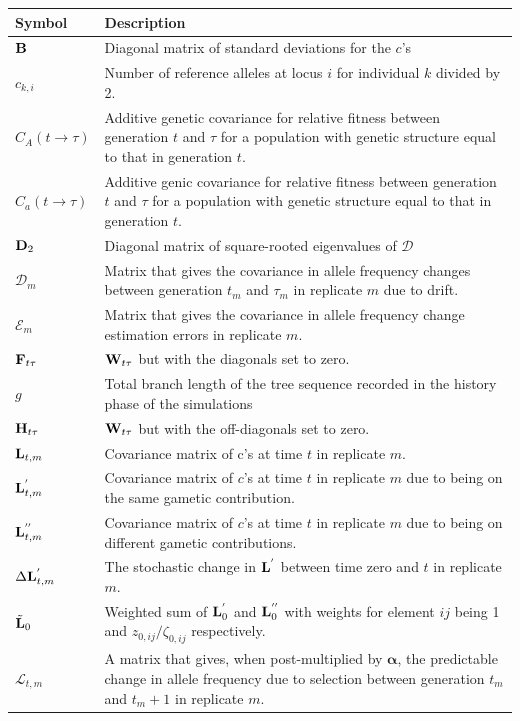 \documentclass[12pt]{article}
\begin{document}
\begin{longtable}{|p{2cm}|p{13cm}|}
\hline
Symbol&Description\\
\hline
${\bf B}$&Diagonal matrix of standard deviations for the $c$'s\\
$c_{k,i}$& Number of reference alleles at locus $i$ for individual $k$ divided by 2.\\
$C_{A}(t\rightarrow\tau)$&Additive genetic covariance for relative fitness between generation $t$ and $\tau$ for a population with genetic structure equal to that in generation $t$.\\
$C_{a}(t\rightarrow\tau)$&Additive genic covariance for relative fitness between generation $t$ and $\tau$ for a population with genetic structure equal to that in generation $t$.\\
${\bf D}_{2}$&Diagonal matrix of square-rooted eigenvalues of $\boldsymbol{\mathcal{D}}$\\
$\boldsymbol{\mathcal{D}}_m$&Matrix that gives the covariance in allele frequency changes between generation $t_m$ and $\tau_m$ in replicate $m$ due to drift.\\
$\boldsymbol{\mathcal{E}}_m$&Matrix that gives the covariance in allele frequency change estimation errors in replicate $m$.\\
${\bf F}_{t\tau}$&${\bf W}_{t\tau}$ but with the diagonals set to zero.\\
$g$&Total branch length of the tree sequence recorded in the history phase of the simulations\\
${\bf H}_{t\tau}$&${\bf W}_{t\tau}$ but with the off-diagonals set to zero.\\
${\bf L}_{t,m}$&Covariance matrix of c's at time $t$ in replicate $m$.\\
${\bf L}^{'}_{t,m}$&Covariance matrix of $c$'s at time $t$ in replicate $m$ due to being on the same gametic contribution. \\
${\bf L}^{''}_{t,m}$&Covariance matrix of $c$'s at time $t$ in replicate $m$ due to being on different gametic contributions. \\
$\Delta{\bf L}^{'}_{t,m}$&The stochastic change in ${\bf L}^{'}$ between time zero and $t$ in replicate $m$.\\
$\tilde{\bf L}_{0}$&Weighted sum of ${\bf L}^{'}_0$ and ${\bf L}^{''}_0$ with weights for element $ij$ being 1 and $z_{{0},ij}/\zeta_{{0},ij}$ respectively.\\
$\boldsymbol{\mathcal{L}}_{t,m}$&A matrix that gives, when post-multiplied by $\boldsymbol{\alpha}$, the predictable change in allele frequency due to selection between generation $t_m$ and $t_m+1$ in replicate $m$.\\

\end{longtable}
\end{document}
